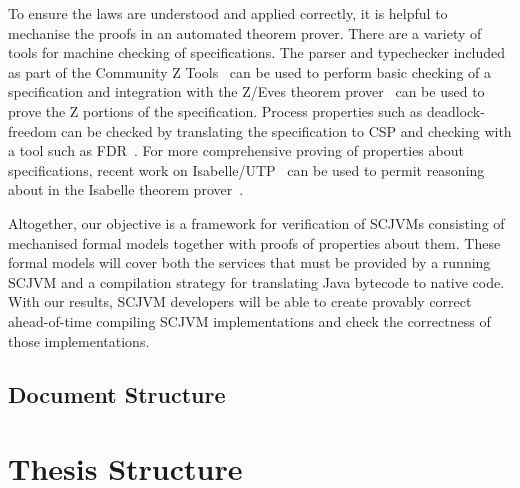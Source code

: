 \documentclass[a4paper,10pt]{report}
\begin{document}
To ensure the laws are understood and applied correctly, it is helpful
to mechanise the proofs in an automated theorem prover.
There are a variety of tools for machine checking of \Circus{}
specifications.
The \Circus{} parser and typechecker included as part of the Community
Z Tools~\cite{malik2011, xavier2008, malik2005, miller2005} can be
used to perform basic checking of a \Circus{} specification and
integration with the Z/Eves theorem prover~\cite{saaltink1997} can be
used to prove the Z portions of the \Circus{} specification.
Process properties such as deadlock-freedom can be checked by
translating the \Circus{} specification to CSP and checking with a
tool such as FDR~\cite{gibson-robinson2014}.
For more comprehensive proving of properties about \Circus{}
specifications, recent work on Isabelle/UTP~\cite{foster2015} can be
used to permit reasoning about \Circus{} in the Isabelle theorem
prover~\cite{nipkow2002}.

Altogether, our objective is a framework for verification of SCJVMs
consisting of mechanised formal models together with proofs of
properties about them.
These formal models will cover both the services that must be provided
by a running SCJVM and a compilation strategy for translating Java
bytecode to native code.
With our results, SCJVM developers will be able to create provably
correct ahead-of-time compiling SCJVM implementations and check the
correctness of those implementations.


\section{Document Structure}
\label{document-structure-section}

% 

\chapter{Thesis Structure}
\end{document}
